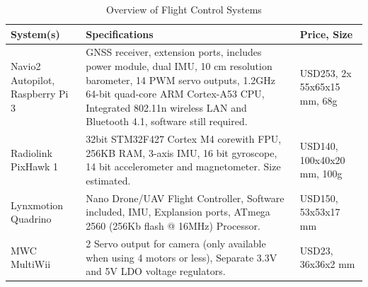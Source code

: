 \begin{table}[ht]
    \centering
    \caption{Overview of Flight Control Systems}
    \label{tab:flig_cont}
    \begin{tabularx}{\textwidth}{>{\small}p{.12\linewidth} L  >{\small}p{.13\textwidth}  }
    \toprule
\textbf{System(s) }     & \textbf{Specifications }       &\textbf{Price, Size}                                %
\\ \midrule
Navio2 Autopilot, Raspberry Pi 3                       & GNSS receiver, extension ports, includes power module, dual IMU, 10 cm resolution barometer, 14 PWM servo outputs, 1.2GHz 64-bit quad-core ARM Cortex-A53 CPU, Integrated 802.11n wireless LAN and Bluetooth 4.1, software still required.                                                                                                                                                                                                                                                                                  & USD253,   2x   55x65x15 mm, 68g                                  %
\\ \hdashline             
Radiolink PixHawk 1             & 32bit STM32F427 Cortex M4 corewith FPU, 256KB RAM, 3-axis IMU, 16 bit gyroscope, 14 bit accelerometer and magnetometer. Size estimated.                         & USD140, 100x40x20 mm, 100g                                     %
\\ \hdashline
Lynxmotion Quadrino     & Nano Drone/UAV Flight Controller, Software included, IMU, Explansion ports, ATmega 2560 (256Kb flash @ 16MHz) Processor.                                                                 & USD150, 53x53x17 mm                                                                                                                           %
\\ \hdashline 
MWC MultiWii  & 2 Servo output for camera (only available when using 4 motors or less), Separate 3.3V and 5V LDO voltage regulators.                                                                                                                                                                                                                                                & USD23,      36x36x2 mm                                                                                                               %

\end{tabularx}
\end{table}
